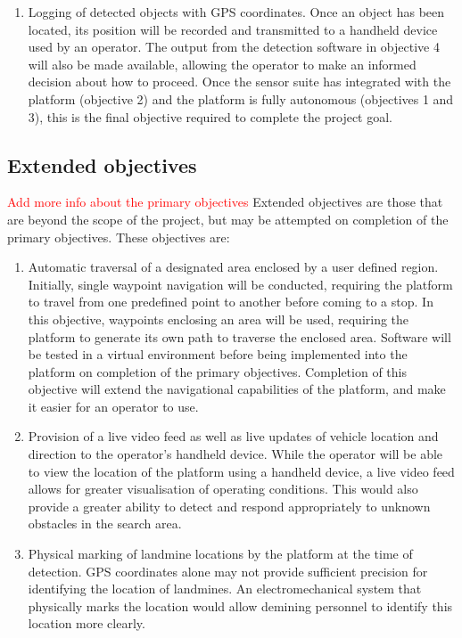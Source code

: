 \documentclass[main.tex]{subfiles}
\begin{document}
\begin{enumerate}
\item Logging of detected objects with GPS coordinates. Once an object has been located, its position will be recorded and transmitted to a handheld device used by an operator. The output from the detection software in objective 4 will also be made available, allowing the operator to make an informed decision about how to proceed. Once the sensor suite has integrated with the platform (objective 2) and the platform is fully autonomous (objectives 1 and 3), this is the final objective required to complete the project goal.
\end{enumerate}

\subsection{Extended objectives}
\textcolor{red}{Add more info about the primary objectives}
Extended objectives are those that are beyond the scope of the project, but may be attempted on completion of the primary objectives. These objectives are:

\begin{enumerate}
\item Automatic traversal of a designated area enclosed by a user defined region. Initially, single waypoint navigation will be conducted, requiring the platform to travel from one predefined point to another before coming to a stop. In this objective, waypoints enclosing an area will be used, requiring the platform to generate its own path to traverse the enclosed area. Software will be tested in a virtual environment before being implemented into the platform on completion of the primary objectives. Completion of this objective will extend the navigational capabilities of the platform, and make it easier for an operator to use. 

\item Provision of a live video feed as well as live updates of vehicle location and direction to the operator's handheld device. While the operator will be able to view the location of the platform using a handheld device, a live video feed allows for greater visualisation of operating conditions. This would also provide a greater ability to detect and respond appropriately to unknown obstacles in the search area.

\item Physical marking of landmine locations by the platform at the time of detection. GPS coordinates alone may not provide sufficient precision for identifying the location of landmines. An electromechanical system that physically marks the location would allow demining personnel to identify this location more clearly.
\end{enumerate}
\end{document}
